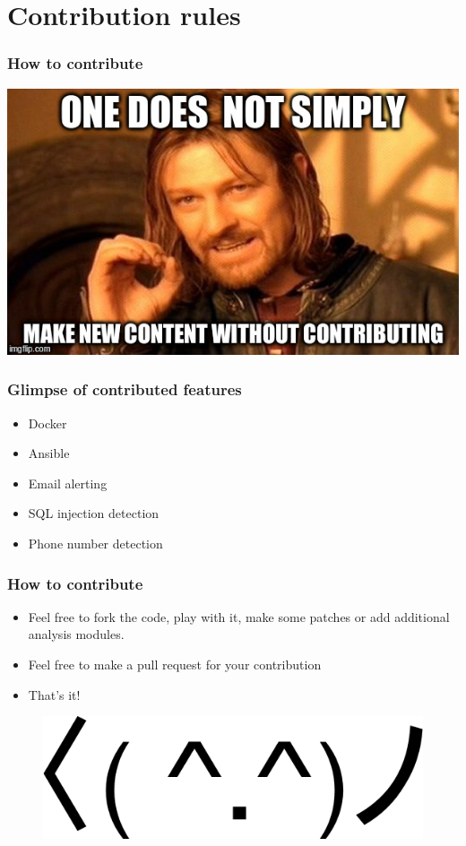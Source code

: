 \documentclass{beamer}
\begin{document}
\section{Contribution rules}
\begin{frame}
\frametitle{How to contribute}
    \centerline{\includegraphics[scale=0.5]{images/one-does-not-simply.jpeg}}
\end{frame}

\begin{frame}
    \frametitle{Glimpse of contributed features}
    \begin{itemize}
        \item Docker
        \item Ansible
        \item Email alerting
        \item SQL injection detection
        \item Phone number detection
    \end{itemize}
\end{frame}


\begin{frame}
\frametitle{How to contribute}
    \begin{itemize}
        \item Feel free to fork the code, play with it, make some patches or add additional analysis modules.
        \pause
        \item Feel free to make a pull request for your contribution
        \pause
        \item That's it!
    \end{itemize}
    \begin{figure}
        \includegraphics[scale=0.2]{images/dancing.png}
    \end{figure}
\end{frame}
\end{document}
